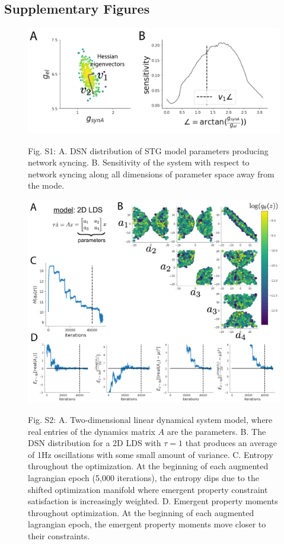 \documentclass[11pt]{article}
\begin{document}
\subsection{Supplementary Figures}

\begin{figure}
\begin{center}
\includegraphics[scale=0.7]{figs/figS1/figS1.pdf}
\end{center}
Fig. S1: A. DSN distribution of STG model parameters producing network syncing.  B. Sensitivity of the system with respect to network syncing along all dimensions of parameter space away from the mode.
\end{figure}

\begin{figure}
\begin{center}
\includegraphics[scale=0.5]{figs/figS2/figS2.pdf}
\end{center}
Fig. S2: A. Two-dimensional linear dynamical system model, where real entries of the dynamics matrix $A$ are the parameters.  B. The DSN distribution for a 2D LDS with $\tau=1$ that produces an average of 1Hz oscillations with some small amount of variance.  C. Entropy throughout the optimization.  At the beginning of each augmented lagrangian epoch (5,000 iterations), the entropy dips due to the shifted optimization manifold where emergent property constraint satisfaction is increasingly weighted.  D. Emergent property moments throughout optimization.  At the beginning of each augmented lagrangian epoch, the emergent property moments move closer to their constraints.
\end{figure}
\end{document}
